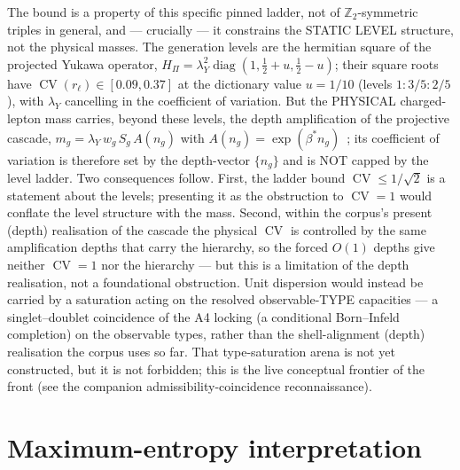 \documentclass[11pt]{article}
\theoremstyle{definition}
\theoremstyle{remark}
\newcommand{\CV}{\operatorname{CV}}
\newcommand{\rl}{r_{\ell}}
\begin{document}
    The bound is a property of this specific pinned ladder, not of $\mathbb Z_2$-symmetric triples in general, and
    --- crucially --- it constrains the STATIC LEVEL structure, not the physical masses.
    The generation levels are the hermitian square of the projected Yukawa operator,
    $H_\Pi = \lambda_Y^2 \operatorname{diag}(1, \tfrac12 + u, \tfrac12 - u)$; their square roots have
    $\CV(\rl) \in [0.09, 0.37]$ at the dictionary value $u = 1/10$ (levels $1 : 3/5 : 2/5$), with $\lambda_Y$
    cancelling in the coefficient of variation.
    But the PHYSICAL charged-lepton mass carries, beyond these levels, the depth amplification of the projective
    cascade, $m_g = \lambda_Y\, w_g\, S_g\, A(n_g)$ with $A(n_g) = \exp(\beta^\ast n_g)$~\cite{Beau2026pyo}; its
    coefficient of variation is therefore set by the depth-vector $\{n_g\}$ and is NOT capped by the level ladder.
    Two consequences follow.
    First, the ladder bound $\CV \le 1/\sqrt2$ is a statement about the levels; presenting it as the obstruction to
    $\CV = 1$ would conflate the level structure with the mass.
    Second, within the corpus's present (depth) realisation of the cascade the physical $\CV$ is controlled by the
    same amplification depths that carry the hierarchy, so the forced $O(1)$ depths give neither $\CV = 1$ nor the
    hierarchy --- but this is a limitation of the depth realisation, not a foundational obstruction.
    Unit dispersion would instead be carried by a saturation acting on the resolved observable-TYPE capacities ---
    a singlet--doublet coincidence of the A4 locking (a conditional Born--Infeld completion) on the observable types,
    rather than the shell-alignment (depth) realisation the corpus uses so far.
    That type-saturation arena is not yet constructed, but it is not forbidden; this is the live conceptual frontier
    of the front (see the companion admissibility-coincidence reconnaissance).

  \section{Maximum-entropy interpretation}
    \label{sec:maxent}
\end{document}
